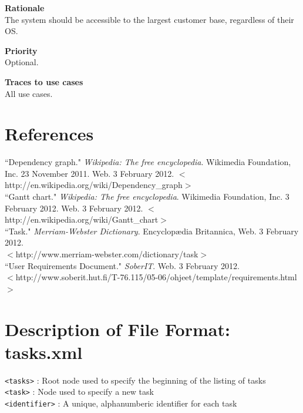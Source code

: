 \documentclass[12pt]{article}
\begin{document}
\noindent
{\bf Rationale}\\
The system should be accessible to the largest customer base, regardless of their OS.

\noindent
{\bf Priority}\\
Optional.

\noindent
{\bf Traces to use cases}\\
All use cases.

\section{References}



``Dependency graph." \emph{Wikipedia: The free encyclopedia}.
Wikimedia Foundation, Inc. 23 November 2011. Web. 3 February 2012.
$<$http://en.wikipedia.org/wiki/Dependency\_graph$>$ \\

``Gantt chart." \emph{Wikipedia: The free encyclopedia}.
Wikimedia Foundation, Inc. 3 February 2012. Web. 3 February 2012.
$<$http://en.wikipedia.org/wiki/Gantt\_chart$>$ \\

``Task." \emph{Merriam-Webster Dictionary}. Encyclop{\ae}dia Britannica,
Web. 3 February 2012. \\ $<$http://www.merriam-webster.com/dictionary/task$>$ \\

``User Requirements Document." \emph{SoberIT}. Web. 3 February 2012.\\
$<$http://www.soberit.hut.fi/T-76.115/05-06/ohjeet/template/requirements.html$>$ \\

\pagebreak

\appendix

\section{Description of File Format: tasks.xml}

\texttt{<tasks>} : Root node used to specify the beginning of the listing of tasks \\

\texttt{<task>} : Node used to specify a new task \\

\texttt{<identifier>} : A unique, alphanumberic identifier for each task \\
\end{document}
